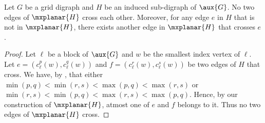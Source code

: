 \documentclass{toc}
\begin{document}
\begin{lemma}
\label{lem:planarG}
Let $G$ be a grid %
digraph %
and $H$ be
%
 an induced  %
sub-digraph %
 of $\aux{G}$. No two edges of $\mxplanar{H}$ cross each other. Moreover, for any edge $e$ in $H$ that is not in $\mxplanar{H}$, there exists another edge in $\mxplanar{H}$ that crosses $e$.
\end{lemma}
\begin{proof}
Let ${\ell}$ be a block of $\aux{G}$ and $w$ be the smallest index vertex of ${\ell}$. Let $e = (c^p_{\ell}(w), c^q_{\ell}(w))$ and $f = (c^r_{\ell}(w), c^s_{\ell}(w))$ be two edges of $H$ that cross. We have, by , that either $\min(p,q) < \min(r, s) < \max(p, q) < \max(r, s)$ or $\min(r,s) < \min(p, q) < \max(r, s) < \max(p, q)$. Hence, by our construction of $\mxplanar{H}$, atmost one of $e$ and $f$ belongs to it. Thus no two edges of $\mxplanar{H}$ %
 cross.


\end{proof}
\end{document}
